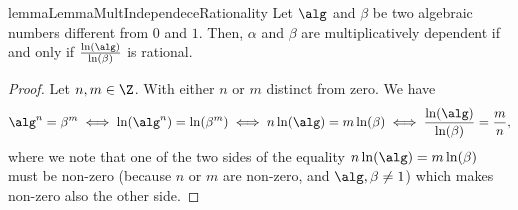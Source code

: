 \begin{restatable}{lemma}{LemmaMultIndependeceRationality}
  \label{lemma:mult-independence-rationality}
  Let $\alg$ and $\beta$ be two algebraic numbers different from $0$ and $1$. Then, $\alpha$ and $\beta$ are multiplicatively dependent 
  if and only if $\frac{\ln(\alg)}{\ln(\beta)}$ is rational.
\end{restatable}

\begin{proof}
  Let $n,m \in \Z$. With either $n$ or $m$ distinct from zero.
  We have 
  \begin{align*}
    \alg^n = \beta^m 
    \iff \ln(\alg^n) = \ln(\beta^m)
    \iff n\ln(\alg) = m\ln(\beta)
    \iff \frac{\ln(\alg)}{\ln(\beta)} = \frac{m}{n},
  \end{align*}
  where we note that one of the two sides of the equality $n\ln(\alg) =
  m\ln(\beta)$ must be non-zero (because $n$ or $m$ are non-zero, and
  $\alg,\beta \neq 1$) which makes non-zero also the other side.
\end{proof}

\TheoremRootBarrier*

